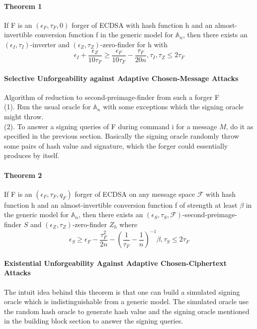 \documentclass[18]{article}
\begin{document}
\paragraph{Theorem 1}
If F is an $(\epsilon_F,\tau_F,0)$ forger of ECDSA with hash function h and an almost-invertible conversion function f in the generic model for $\mathbb{A}_n$,
then there exists an $(\epsilon_I,\tau_I)$-inverter and $(\epsilon_Z,\tau_Z)$-zero-finder for h with
\begin{equation*}
\epsilon_I+\frac{\epsilon_Z}{10\tau_F} \ge \frac{\epsilon_F}{10\tau_F} - \frac{\tau_F}{20n},\tau_I,\tau_Z \le 2\tau_F
\end{equation*}

\paragraph{Selective Unforgeability against Adaptive Chosen-Message Attacks}
Algorithm of reduction to second-preimage-finder from such a forger F\\
(1). Run the usual oracle for $\mathbb{A}_n$ with some exceptions which the signing oracle might throw.\\
(2). To answer a signing queries of F during command i for a message $M$, do it as specified in the previous section. Basically the signing oracle randomly throw some pairs of hash value and signature, which the forger could essentially produces by itself.

\paragraph{Theorem 2} If F is an $(\epsilon_F,\tau_F,q_F)$ forger of ECDSA on any message space $\mathscr{F}$ with hash function h and an almost-invertible conversion function f of strength at least $\beta$ in the generic model for $\mathbb{A}_n$,
then there exists an $(\epsilon_S,\tau_S,\mathscr{F})$-second-preimage-finder $S$ and $(\epsilon_Z,\tau_Z)$-zero-finder $Z_h$ where
\begin{equation*}
\epsilon_S \ge \epsilon_F - \frac{\tau_F^2}{2n} - (\frac{1}{\tau_F}-\frac{1}{n})^{-1}\beta, \tau_S \le 2\tau_F
\end{equation*}

\paragraph{Existential Unforgeability Against Adaptive Chosen-Ciphertext Attacks}
The intuit idea behind this theorem is that one can build a simulated signing oracle which is indistinguishable from a generic model. The simulated oracle use the random hash oracle to generate hash value and the signing oracle mentioned in the building block section to answer the signing queries.
\end{document}
